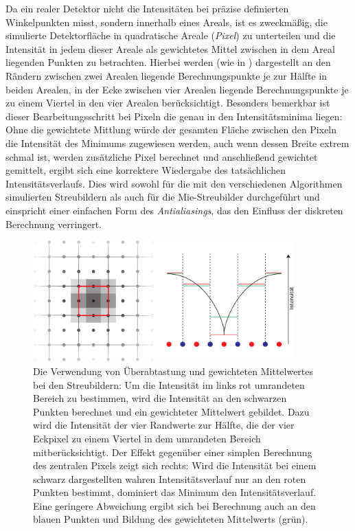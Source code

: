 Da ein realer Detektor nicht die Intensitäten bei präzise definierten Winkelpunkten misst, sondern innerhalb eines Areals, ist es zweckmäßig, die simulierte Detektorfläche in quadratische Areale (\textit{Pixel}) zu unterteilen und die Intensität in jedem dieser Areale als gewichtetes Mittel zwischen in dem Areal liegenden Punkten zu betrachten.
Hierbei werden (wie in ) dargestellt an den Rändern zwischen zwei Arealen liegende Berechnungspunkte je zur Hälfte in beiden Arealen, in der Ecke zwischen vier Arealen liegende Berechnungspunkte je zu einem Viertel in den vier Arealen berücksichtigt.
Besonders bemerkbar ist dieser Bearbeitungsschritt bei Pixeln die genau in den Intensitätsminima liegen: Ohne die gewichtete Mittlung würde der gesamten Fläche zwischen den Pixeln die Intensität des Minimums zugewiesen werden, auch wenn dessen Breite extrem schmal ist, werden zusätzliche Pixel berechnet und anschließend gewichtet gemittelt, ergibt sich eine korrektere Wiedergabe des tatsächlichen Intensitätsverlaufs. Dies wird sowohl für die mit den verschiedenen Algorithmen simulierten Streubildern als auch für die Mie-Streubilder durchgeführt und einspricht einer einfachen Form des \textit{Antialiasings}, das den Einfluss der diskreten Berechnung verringert.
\begin{figure} %
	\centering
	\includegraphics[width=0.9\textwidth]{images/average.pdf}
	\caption[Gewichteter Mittelwert]{Die Verwendung von Überabtastung und gewichteten Mittelwertes bei den Streubildern: Um die Intensität im links rot umrandeten Bereich zu bestimmen, wird die Intensität an den schwarzen Punkten berechnet und ein gewichteter Mittelwert gebildet. Dazu wird die Intensität der vier Randwerte zur Hälfte, die der vier Eckpixel zu einem Viertel in dem umrandeten Bereich mitberücksichtigt. Der Effekt gegenüber einer simplen Berechnung des zentralen Pixels zeigt sich rechts: Wird die Intensität bei einem schwarz dargestellten wahren Intensitätsverlauf nur an den roten Punkten bestimmt, dominiert das Minimum den Intensitätsverlauf. Eine geringere Abweichung ergibt sich bei Berechnung auch an den blauen Punkten und Bildung des gewichteten Mittelwerts (grün).}
	\label{fig:average}
\end{figure}%

